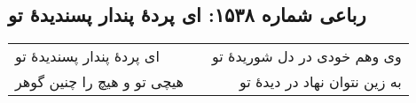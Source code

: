 \begin{center}
\section*{رباعی شماره ۱۵۳۸: ای پردهٔ پندار پسندیدهٔ تو}
\label{sec:1538}
\begin{longtable}{l p{0.5cm} r}
ای پردهٔ پندار پسندیدهٔ تو
&&
وی وهم خودی در دل شوریدهٔ تو
\\
هیچی تو و هیچ را چنین گوهر
&&
به زین نتوان نهاد در دیدهٔ تو
\\
\end{longtable}
\end{center}
